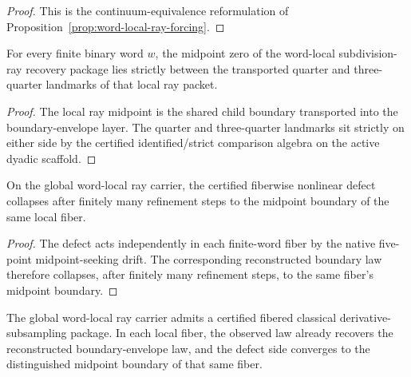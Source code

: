 \begin{proof}
This is the continuum-equivalence reformulation of
Proposition~\ref{prop:word-local-ray-forcing}.
\end{proof}

\begin{proposition}
\label{prop:word-local-ray-midpoint}
For every finite binary word $w$, the midpoint zero of the word-local
subdivision-ray recovery package lies strictly between the transported quarter
and three-quarter landmarks of that local ray packet.
\end{proposition}

\begin{proof}
The local ray midpoint is the shared child boundary transported into the
boundary-envelope layer. The quarter and three-quarter landmarks sit strictly
on either side by the certified identified/strict comparison algebra on the
active dyadic scaffold.
\end{proof}

\begin{proposition}
\label{prop:word-local-ray-defect}
On the global word-local ray carrier, the certified fiberwise nonlinear defect
collapses after finitely many refinement steps to the midpoint boundary of the
same local fiber.
\end{proposition}

\begin{proof}
The defect acts independently in each finite-word fiber by the native
five-point midpoint-seeking drift. The corresponding reconstructed boundary
law therefore collapses, after finitely many refinement steps, to the same
fiber's midpoint boundary.
\end{proof}

\begin{corollary}
\label{cor:word-local-ray-fibered-derivative}
The global word-local ray carrier admits a certified fibered classical
derivative-subsampling package. In each local fiber, the observed law already
recovers the reconstructed boundary-envelope law, and the defect side
converges to the distinguished midpoint boundary of that same fiber.
\end{corollary}

